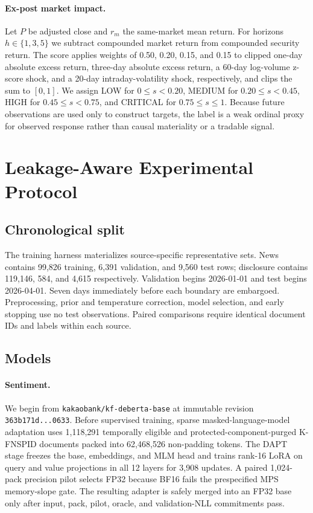 \documentclass[11pt]{article}
\begin{document}
\paragraph{Ex-post market impact.}
Let $P$ be adjusted close and $r_m$ the same-market mean return. For horizons $h\in\{1,3,5\}$ we subtract compounded market return from compounded security return. The score applies weights of 0.50, 0.20, 0.15, and 0.15 to clipped one-day absolute excess return, three-day absolute excess return, a 60-day log-volume z-score shock, and a 20-day intraday-volatility shock, respectively, and clips the sum to $[0,1]$. We assign LOW for $0\leq s<0.20$, MEDIUM for $0.20\leq s<0.45$, HIGH for $0.45\leq s<0.75$, and CRITICAL for $0.75\leq s\leq1$. Because future observations are used only to construct targets, the label is a weak ordinal proxy for observed response rather than causal materiality or a tradable signal.

\section{Leakage-Aware Experimental Protocol}

\subsection{Chronological split}

The training harness materializes source-specific representative sets. News contains 99,826 training, 6,391 validation, and 9,560 test rows; disclosure contains 119,146, 584, and 4,615 respectively. Validation begins 2026-01-01 and test begins 2026-04-01. Seven days immediately before each boundary are embargoed. Preprocessing, prior and temperature correction, model selection, and early stopping use no test observations. Paired comparisons require identical document IDs and labels within each source.

\subsection{Models}

\paragraph{Sentiment.}
We begin from \texttt{kakaobank/kf-deberta-base} at immutable revision \texttt{363b171d...0633}. Before supervised training, sparse masked-language-model adaptation uses 1,118,291 temporally eligible and protected-component-purged K-FNSPID documents packed into 62,468,526 non-padding tokens. The DAPT stage freezes the base, embeddings, and MLM head and trains rank-16 LoRA on query and value projections in all 12 layers for 3,908 updates. A paired 1,024-pack precision pilot selects FP32 because BF16 fails the prespecified MPS memory-slope gate. The resulting adapter is safely merged into an FP32 base only after input, pack, pilot, oracle, and validation-NLL commitments pass.
\end{document}
